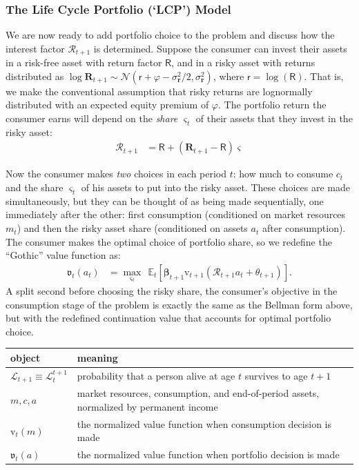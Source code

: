 \documentclass{article}
\newcommand{\Rport}{\mathcal{R}}
\newcommand{\vFunc}{\mathrm{v}}
\newcommand{\Alive}{\mathcal{L}}
\newcommand{\Ex}{\mathbb{E}}
\newcommand{\cNrm}{c}
\newcommand{\mNrm}{m}
\newcommand{\aNrm}{a}
\newcommand{\Rfree}{\mathsf{R}}
\newcommand{\rfree}{\mathsf{r}}
\newcommand{\eprem}{\varphi}
\newcommand{\Risky}{\mathbf{R}}
\newcommand{\risky}{\mathbf{r}}
\begin{document}
\subsubsection{The Life Cycle Portfolio (`LCP') Model}\label{lcp-model}

We are now ready to add portfolio choice to the problem and discuss how the interest factor $\Rport_{t+1}$ is determined.
Suppose the consumer can invest their assets in a risk-free asset with return factor $\Rfree$, and in a risky asset with returns distributed as $\log \Risky_{t+1} \sim \mathcal{N}(\rfree + \eprem - \sigma^{2}_{\risky}/2, \sigma_{\risky}^{2})$, where $\rfree = \log(\Rfree)$.
That is, we make the conventional assumption that risky returns are lognormally distributed with an expected equity premium of $\eprem$.
The portfolio return the consumer earns will depend on the \textit{share} $\varsigma_t$ of their assets that they invest in the risky asset:
\begin{align}
    \Rport_{t+1} & = \Rfree + (\Risky_{t+1}-\Rfree)\varsigma
\end{align}

Now the consumer makes \textit{two} choices in each period $t$: how much to consume $\cNrm_t$ and the share $\varsigma_t$ of his assets to put into the risky asset.
These choices are made simultaneously, but they can be thought of as being made sequentially, one immediately after the other: first consumption (conditioned on market resources $\mNrm_t$) and then the risky asset share (conditioned on assets $\aNrm_t$ after consumption).
The consumer makes the optimal choice of portfolio share, so we redefine the ``Gothic'' value function as:
\begin{align}
\mathfrak{v}_{t}(\aNrm_t) & = \max_{\varsigma_t}~~ \Ex_{t}\left[ \pmb{\beta}_{t+1} \vFunc_{t+1}(\Rport_{t+1} \aNrm_t + \theta_{t+1}) \right].
\end{align}
A split second before choosing the risky share, the consumer's objective in the consumption stage of the problem is exactly the same as the Bellman form above, but with the redefined continuation value that accounts for optimal portfolio choice.

\bigskip\noindent
\begin{tabular}{p{}p{}}
\toprule
object & meaning \\
\hline
$\Alive_{t+1} \equiv \Alive_{t}^{t+1}$ & probability that a person alive at age $t$ survives to age $t+1$ \\
$\mNrm, \cNrm, \aNrm$ & market resources, consumption, and end-of-period assets, normalized by permanent income \\
$\vFunc_{t}(\mNrm)$ & the normalized value function when consumption decision is made \\
$\mathfrak{v}_{t}(\aNrm)$ & the normalized value function when portfolio decision is made \\
\bottomrule
\end{tabular}
\end{document}
